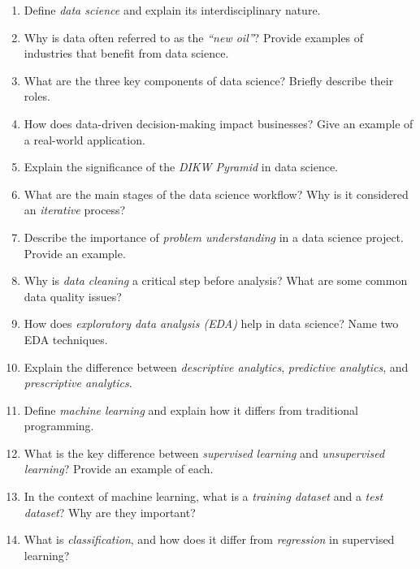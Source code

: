 \documentclass[
]{book}
\theoremstyle{definition}
\theoremstyle{definition}
\theoremstyle{definition}
\theoremstyle{definition}
\theoremstyle{remark}
\begin{document}
\begin{enumerate}
\def\labelenumi{\arabic{enumi}.}
\item
  Define \emph{data science} and explain its interdisciplinary nature.\\
\item
  Why is data often referred to as the \emph{``new oil''}? Provide examples of industries that benefit from data science.\\
\item
  What are the three key components of data science? Briefly describe their roles.\\
\item
  How does data-driven decision-making impact businesses? Give an example of a real-world application.\\
\item
  Explain the significance of the \emph{DIKW Pyramid} in data science.
\item
  What are the main stages of the data science workflow? Why is it considered an \emph{iterative} process?\\
\item
  Describe the importance of \emph{problem understanding} in a data science project. Provide an example.\\
\item
  Why is \emph{data cleaning} a critical step before analysis? What are some common data quality issues?\\
\item
  How does \emph{exploratory data analysis (EDA)} help in data science? Name two EDA techniques.\\
\item
  Explain the difference between \emph{descriptive analytics}, \emph{predictive analytics}, and \emph{prescriptive analytics}.
\item
  Define \emph{machine learning} and explain how it differs from traditional programming.\\
\item
  What is the key difference between \emph{supervised learning} and \emph{unsupervised learning}? Provide an example of each.\\
\item
  In the context of machine learning, what is a \emph{training dataset} and a \emph{test dataset}? Why are they important?\\
\item
  What is \emph{classification}, and how does it differ from \emph{regression} in supervised learning?\\

\end{enumerate}
\end{document}
